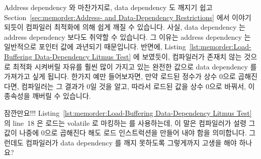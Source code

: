 Address dependency 와 마찬가지로, data dependency 도 깨지기 쉽고
Section~\ref{sec:memorder:Address- and Data-Dependency Restrictions} 에서
이야기 되듯이 컴파일러 최적화에 의해 쉽게 깨질 수 있습니다.
사실, data dependency 는 address dependency 보다도 취약할 수 있습니다.
그 이유는 address dependency 는 일반적으로 포인터 값에 과년되기 때문입니다.
반면에,
Listing~\ref{lst:memorder:Load-Buffering Data-Dependency Litmus Test}
에 보였듯이, 컴파일러가 존재치 않는 것으로 최적화 시켜버릴 자유를 훨씬 많이
가지고 있는 완전한 값으로 data dependency 를 가져가고 싶게 됩니다.
한가지 예만 들어보자면, 만약 로드된 정수가 상수 0으로 곱해진다면, 컴파일러는 그
결과가 0일 것을 알고, 따라서 로드된 값을 상수 0으로 바꿔서, 이 종속성을 깨버릴
수 있습니다.

\QuickQuiz{}
	잠깐만요!!!
	Listing~\ref{lst:memorder:Load-Buffering Data-Dependency Litmus Test}
	의 line~18 은 로드는 volatile 로 마킹하는  를
	사용하는데, 이 말은 컴파일러가 설령 그 값이 나중에 0으로 곱해진다 해도
	로드 인스트럭션을 만들어 내야 함을 의미합니다.
	그런데도 컴파일러가 data dependency 를 깨지 못하도록 그렇게까지 고생을
	해야 하나요?
	\iffalse

